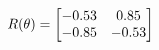 \documentclass[preview]{standalone}
\begin{document}
\begin{align*}
\special{dvisvgm:raw <g id='unique000'>}R(\theta) = \begin{bmatrix}-0.53 & 0.85\\-0.85 & -0.53\end{bmatrix}\special{dvisvgm:raw </g>}
\end{align*}
\end{document}
